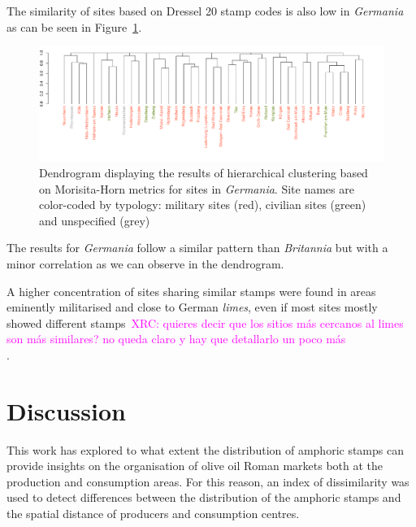 \documentclass[review]{elsarticle}
\newcommand{\memo}[2]{\textcolor{#1}{#2}}
\newcommand{\xavi}[1]{\memo{magenta}{XRC: #1\\}}
\begin{document}
The similarity of sites based on Dressel 20 stamp codes is also low in \textit{Germania} as can be seen in Figure~\ref{germap}. 

\begin{figure}
	\centering
\includegraphics[angle=180, width=\linewidth]{figs/dendroger5.pdf}
\caption{Dendrogram displaying the results of hierarchical clustering based on Morisita-Horn metrics for sites in \textit{Germania}. Site names are color-coded by typology: military sites (red), civilian sites (green) and unspecified (grey)}
\label{germap}
\end{figure}

The results for \textit{Germania} follow a similar pattern than \textit{Britannia} but with a minor correlation as we can observe in the dendrogram.

A higher concentration of sites sharing similar stamps were found in areas eminently militarised and close to German \textit{limes}, even if most sites mostly showed different stamps~\xavi{quieres decir que los sitios más cercanos al limes son más similares? no queda claro y hay que detallarlo un poco más}.



\section{Discussion}


This work has explored to what extent the distribution of amphoric stamps can provide insights on the organisation of olive oil Roman markets both at the production and consumption areas. For this reason, an index of dissimilarity was used to detect differences between the distribution of the amphoric stamps and the spatial distance of producers and consumption centres. 
\end{document}
